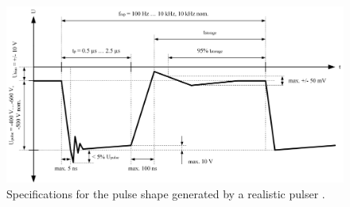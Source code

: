 		\begin{figure}[h]
			\centering
			\includegraphics[width=\textwidth]{Bilder/Pulser_theretical_shape.jpg}
			\caption{Specifications for the pulse shape generated by a realistic pulser \cite{Diss_Meyer}.}
			\label{fig:PulserTheoCurve}
		\end{figure}
